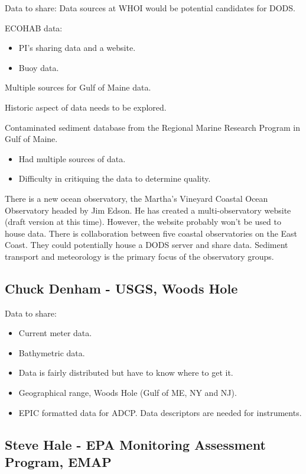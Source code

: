 Data to share:
Data sources at WHOI would be potential candidates for DODS.

ECOHAB data:
\begin{itemize}
\item PI's sharing data and a website.
\item Buoy data.
\end{itemize}

Multiple sources for Gulf of Maine data.

Historic aspect of data needs to be explored.

Contaminated sediment database from the Regional Marine Research
Program in Gulf of Maine.

\begin{itemize}
\item Had multiple sources of data.
\item Difficulty in critiquing the data to determine quality.
\end{itemize}

There is a new ocean observatory, the Martha's Vineyard Coastal Ocean
Observatory headed by Jim Edson.  He has created a multi-observatory
website (draft version at this time).  However, the website probably
won't be used to house data.  There is collaboration between five
coastal observatories on the East Coast.  They could potentially house
a DODS server and share data.  Sediment transport and meteorology is
the primary focus of the observatory groups.


\subsection{Chuck Denham - USGS, Woods Hole}

Data to share:
\begin{itemize}
\item Current meter data.
\item Bathymetric data.
\item Data is fairly distributed but have to know where to get it.
\item Geographical range, Woods Hole (Gulf of ME, NY and NJ).
\item EPIC formatted data for ADCP.  Data descriptors are needed for instruments.
\end{itemize}

\subsection{Steve Hale - EPA Monitoring Assessment Program, EMAP}

